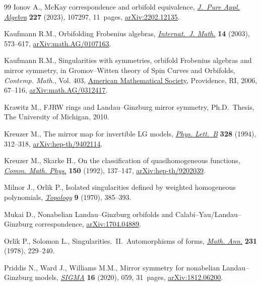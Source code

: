 \documentclass[10pt,a4paper]{article}
\numberwithin{equation}{section}
\begin{document}
\begin{thebibliography}{99}
Ionov A., Mc{K}ay correspondence and orbifold equivalence, \href{https://doi.org/10.1016/j.jpaa.2022.107297}{\textit{J.~Pure
 Appl. Algebra}} \textbf{227} (2023), 107297, 11~pages, \href{https://arxiv.org/abs/2202.12135}{arXiv:2202.12135}.

Kaufmann R.M., Orbifolding {F}robenius algebras, \href{https://doi.org/10.1142/S0129167X03001831}{\textit{Internat.~J. Math.}}
 \textbf{14} (2003), 573--617, \href{https://arxiv.org/abs/math.AG/0107163}{arXiv:math.AG/0107163}.

Kaufmann R.M., Singularities with symmetries, orbifold {F}robenius algebras and
 mirror symmetry, in Gro\-mov--{W}itten theory of {S}pin {C}urves and
 {O}rbifolds, \textit{Contemp. Math.}, Vol. 403, \href{https://doi.org/10.1090/conm/403/07596}{American Mathematical
 Society}, Providence, RI, 2006, 67--116, \href{https://arxiv.org/abs/math.AG/0312417}{arXiv:math.AG/0312417}.

Krawitz M., F{JRW} rings and {L}andau--{G}inzburg mirror symmetry, Ph.D.~Thesis, {T}he {U}niversity of {M}ichigan, 2010.

Kreuzer M., The mirror map for invertible {LG} models, \href{https://doi.org/10.1016/0370-2693(94)91485-0}{\textit{Phys. Lett.~B}}
 \textbf{328} (1994), 312--318, \href{https://arxiv.org/abs/hep-th/9402114}{arXiv:hep-th/9402114}.

Kreuzer M., Skarke H., On the classification of quasihomogeneous functions,
 \href{https://doi.org/10.1007/BF02096569}{\textit{Comm. Math. Phys.}} \textbf{150} (1992), 137--147,
 \href{https://arxiv.org/abs/hep-th/9202039}{arXiv:hep-th/9202039}.

Milnor J., Orlik P., Isolated singularities defined by weighted homogeneous
 polynomials, \href{https://doi.org/10.1016/0040-9383(70)90061-3}{\textit{Topology}} \textbf{9} (1970), 385--393.

Mukai D., Nonabelian {L}andau--{G}inzburg orbifolds and
 {C}alabi--{Y}au/{L}andau--{G}inzburg correspondence, \href{https://arxiv.org/abs/1704.04889}{arXiv:1704.04889}.

Orlik P., Solomon L., Singularities.~{II}.~{A}utomorphisms of forms,
 \href{https://doi.org/10.1007/BF01420243}{\textit{Math. Ann.}} \textbf{231} (1978), 229--240.

Priddis N., Ward J., Williams M.M., Mirror symmetry for nonabelian
 {L}andau--{G}inzburg models, \href{https://doi.org/10.3842/SIGMA.2020.059}{\textit{SIGMA}} \textbf{16} (2020), 059,
 31~pages, \href{https://arxiv.org/abs/1812.06200}{arXiv:1812.06200}.


\end{thebibliography}
\end{document}
